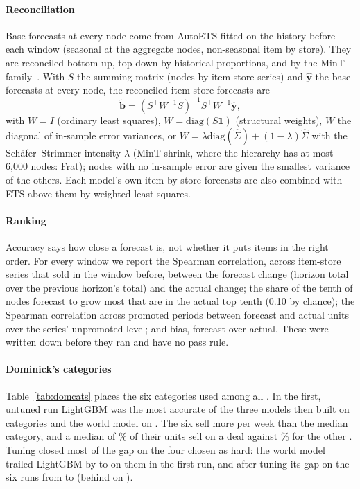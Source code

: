 \paragraph{Reconciliation}
Base forecasts at every node come from AutoETS fitted on the history before each
window (seasonal at the aggregate nodes, non-seasonal item by store). They are
reconciled bottom-up, top-down by historical proportions, and by the MinT
family~\cite{mint}. With $S$ the summing matrix (nodes by item-store series) and
$\hat{\mathbf y}$ the base forecasts at every node, the reconciled item-store
forecasts are
\begin{equation}
\tilde{\mathbf b} = (S^\top W^{-1} S)^{-1} S^\top W^{-1}\hat{\mathbf y},
\end{equation}
with $W = I$ (ordinary least squares), $W = \mathrm{diag}(S\mathbf 1)$ (structural
weights), $W$ the diagonal of in-sample error variances, or $W = \lambda
\mathrm{diag}(\hat\Sigma) + (1-\lambda)\hat\Sigma$ with the Sch\"afer--Strimmer
intensity $\lambda$ (MinT-shrink, where the hierarchy has at most 6,000 nodes:
Frat); nodes with no
in-sample error are given the smallest variance of the others. Each model's own
item-by-store forecasts are also combined with ETS above them by weighted least
squares.

\paragraph{Ranking}
Accuracy says how close a forecast is, not whether it puts items in the right
order. For every window we report the Spearman correlation, across item-store
series that sold in the window before, between the forecast change (horizon
total over the previous horizon's total) and the actual change; the share of the
tenth of nodes forecast to grow most that are in the actual top tenth (0.10 by
chance); the Spearman correlation across promoted periods between forecast and
actual units over the series' unpromoted level; and bias, forecast over actual.
These were written down before they ran and have no pass rule.

\paragraph{Dominick's categories}
Table~\ref{tab:domcats} places the six categories used among all \domCatN{}. In the first, untuned run
LightGBM was the most accurate of the three models then built on \domCatEarlyLgbWins{} categories and the world
model on \domCatEarlyWmWins{}. The six sell more per week than the median category, and a median of
\domCatDealSix\% of their units sell on a deal against \domCatDealRest\% for the other \domCatRest{}. Tuning
closed most of the gap on the four chosen as hard: the world model trailed LightGBM by \domCatEarlyGapHardLo{} to
\domCatEarlyGapHardHi{} on them in the first run, and after tuning its gap on the six runs from
\domCatTunedGapLo{} to \domCatTunedGapHi{} (behind on \domCatTunedBehind{}).


